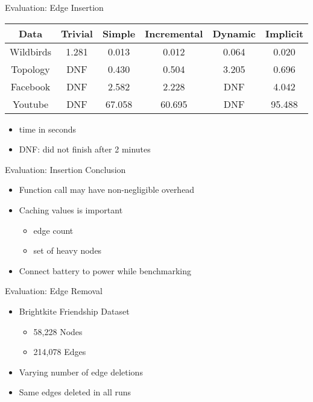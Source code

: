 \documentclass{beamer}
\begin{document}
\begin{frame}{Evaluation: Edge Insertion}
  \begin{table}[]
  \begin{tabular}{|c|c|c|c|c|c|}
    \hline
    Data & Trivial & Simple & Incremental & Dynamic & Implicit \\
    \hline
    \hline
    Wildbirds & 1.281 & 0.013 & 0.012 & 0.064 & 0.020 \\
    \hline
    Topology & DNF & 0.430 & 0.504 & 3.205 & 0.696 \\
    \hline
    Facebook & DNF & 2.582 & 2.228 & DNF & 4.042 \\
    \hline
    Youtube & DNF & 67.058 & 60.695 & DNF & 95.488 \\
    \hline
  \end{tabular}
  \end{table}
  \begin{itemize}
    \item time in seconds
    \item DNF: did not finish after 2 minutes
  \end{itemize}
\end{frame}

\begin{frame}{Evaluation: Insertion Conclusion}
  \begin{itemize}
    \item Function call may have non-negligible overhead
    \item Caching values is important
      \begin{itemize}
        \item edge count
        \item set of heavy nodes
      \end{itemize}
    \item Connect battery to power while benchmarking
  \end{itemize}
\end{frame}

\begin{frame}{Evaluation: Edge Removal}
  \begin{itemize}
    \item Brightkite Friendship Dataset
      \begin{itemize}
        \item 58,228 Nodes
        \item 214,078 Edges
      \end{itemize}
    \item Varying number of edge deletions
    \item Same edges deleted in all runs
  \end{itemize}
\end{frame}
\end{document}
